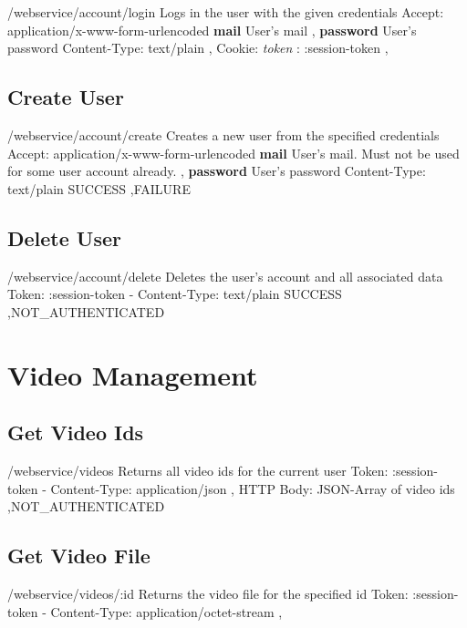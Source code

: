 \documentclass{report}
\begin{document}
 {/webservice/account/login}
   {Logs in the user with the given credentials}
   {Accept: application/x-www-form-urlencoded}
   {\textbf{mail} User's mail \sep
   \textbf{password} User's password}
   {Content-Type: text/plain \sep
   Cookie: \emph{token} : :session-token}
   { \sep {}}
   
\section{Create User}
 {/webservice/account/create}
   {Creates a new user from the specified credentials}
   {Accept: application/x-www-form-urlencoded}
   {\textbf{mail} User's mail. Must not be used for some user account already. \sep
   \textbf{password} User's password}
   {Content-Type: text/plain}
   {SUCCESS \sep FAILURE}
   
\section{Delete User}
 {/webservice/account/delete}
   {Deletes the user's account and all associated data}
   {Token: :session-token}
   {-}
   {Content-Type: text/plain}
   {SUCCESS \sep NOT\_AUTHENTICATED}
   
   
\chapter{Video Management}

\section{Get Video Ids}

 {/webservice/videos}
   {Returns all video ids for the current user}
   {Token: :session-token}
   {-}
   {Content-Type: application/json \sep
   HTTP Body: JSON-Array of video ids}
   { \sep NOT\_AUTHENTICATED}
   
\section{Get Video File}

 {/webservice/videos/:id}
   {Returns the video file for the specified id}
   {Token: :session-token}
   {-}
   {Content-Type: application/octet-stream}
   { \sep {}}
   
\end{document}
